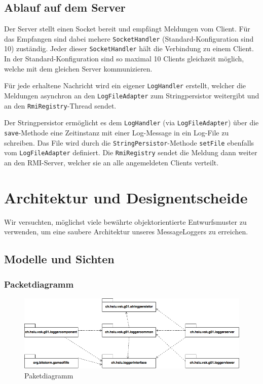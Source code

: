 \documentclass[12pt,a4paper,twosided]{scrartcl}
\begin{document}
\subsection{Ablauf auf dem Server}
Der Server stellt einen Socket bereit und empfängt Meldungen vom Client. Für das Empfangen sind dabei mehere  \texttt{SocketHandler} (Standard-Konfiguration sind 10) zuständig. Jeder dieser  \texttt{SocketHandler} hält die Verbindung zu einem Client. In der Standard-Konfiguration sind so maximal 10 Clients gleichzeit möglich, welche mit dem gleichen Server kommunizieren. 

Für jede erhaltene Nachricht wird ein eigener  \texttt{LogHandler} erstellt, welcher die Meldungen asynchron an den  \texttt{LogFileAdapter} zum Stringpersistor weitergibt und an den  \texttt{RmiRegistry}-Thread sendet. 

Der Stringpersistor ermöglicht es
dem  \texttt{LogHandler} (via  \texttt{LogFileAdapter}) über die  \texttt{save}-Methode eine Zeitinstanz mit einer Log-Message in ein Log-File zu schreiben. Das File wird durch die  \texttt{StringPersistor}-Methode  \texttt{setFile} ebenfalls vom  \texttt{LogFileAdapter} definiert. Die  \texttt{RmiRegistry} sendet die Meldung dann weiter an den RMI-Server, welcher sie an alle angemeldeten
Clients verteilt.

\newpage

\section{Architektur und Designentscheide}
Wir versuchten, möglichst viele bewährte objektorientierte Entwurfsmuster zu verwenden, um eine saubere Architektur unseres MessageLoggers zu erreichen.

\subsection{Modelle und Sichten}
\subsubsection{Packetdiagramm}
\begin{figure}[h!]
	\centering
	\includegraphics[width=\linewidth]{img/Paketdiagramm}
	\caption{Paketdiagramm}
	\label{fig:paketdiagramm}
\end{figure}
\end{document}
